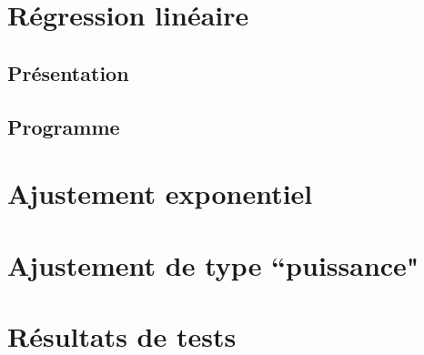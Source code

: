 \documentclass{report}
\begin{document}
    \section{Régression linéaire}
      \subsection{Présentation}
      \subsection{Programme}
	
    \section{Ajustement exponentiel}
    
    \section{Ajustement de type ``puissance"}
    \newpage
    \section{Résultats de tests}
\end{document}

